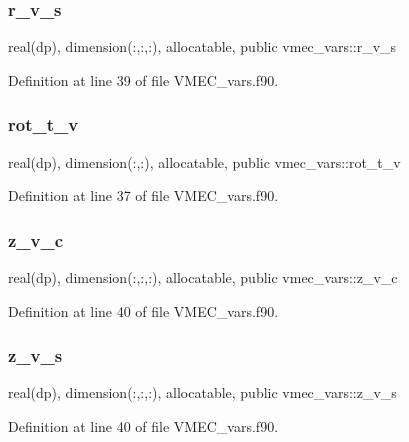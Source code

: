 \subsubsection{\texorpdfstring{r\+\_\+v\+\_\+s}{r\_v\_s}}
{\footnotesize\ttfamily real(dp), dimension(\+:,\+:,\+:), allocatable, public vmec\+\_\+vars\+::r\+\_\+v\+\_\+s}



Definition at line 39 of file V\+M\+E\+C\+\_\+vars.\+f90.

\mbox{\label{namespacevmec__vars_a676475bc7e07d96fc91c2773c8d2c84a}} 
\subsubsection{\texorpdfstring{rot\+\_\+t\+\_\+v}{rot\_t\_v}}
{\footnotesize\ttfamily real(dp), dimension(\+:,\+:), allocatable, public vmec\+\_\+vars\+::rot\+\_\+t\+\_\+v}



Definition at line 37 of file V\+M\+E\+C\+\_\+vars.\+f90.

\mbox{\label{namespacevmec__vars_a66130a0eb0bc39ae0294f008f283efcd}} 
\subsubsection{\texorpdfstring{z\+\_\+v\+\_\+c}{z\_v\_c}}
{\footnotesize\ttfamily real(dp), dimension(\+:,\+:,\+:), allocatable, public vmec\+\_\+vars\+::z\+\_\+v\+\_\+c}



Definition at line 40 of file V\+M\+E\+C\+\_\+vars.\+f90.

\mbox{\label{namespacevmec__vars_ac6a5f1ccefd4c0337189c09166558bb1}} 
\subsubsection{\texorpdfstring{z\+\_\+v\+\_\+s}{z\_v\_s}}
{\footnotesize\ttfamily real(dp), dimension(\+:,\+:,\+:), allocatable, public vmec\+\_\+vars\+::z\+\_\+v\+\_\+s}



Definition at line 40 of file V\+M\+E\+C\+\_\+vars.\+f90.

